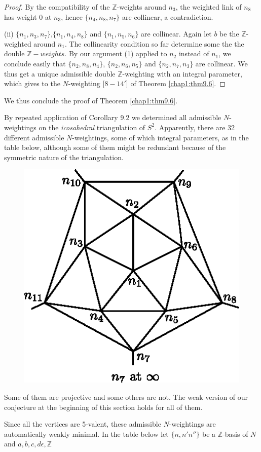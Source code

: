 \begin{proof}
By the compatibility of the $\mathbb{Z}$-weights around $n_3$, the
weighted link of $n_8$ has weight $0$ at $n_3$, hence $\{n_4, n_8,
n_7\}$ are collinear, a contradiction. 

(ii) $\{n_1, n_3, n_7\}$,\pageoriginale $\{n_1, n_4, n_8\}$ and  $\{n_1, n_5,
n_6\}$ are collinear. Again let $b$ be the $\mathbb{Z}$-weighted
around $n_1$. The collinearity condition so far determine some the the
double $\mathbb{Z}-weights$. By our argument (1) applied to $n_2$
instead of $n_1$, we conclude easily that $\{n_2, n_8, n_4\}$, 
$\{n_2,n_6, n_5\}$ and $\{n_2, n_7, n_3\}$ are collinear. We thus get a
unique admissible double $\mathbb{Z}$-weighting with an integral
parameter,  which gives to the $N$-weighting [$8-14'$] of Theorem
\ref{chap1:thm9.6}. 
\end{proof}

We thus conclude the proof of Theorem \ref{chap1:thm9.6}.

\begin{remark*}
By repeated application of Corollary 9.2 we determined all
admissible $N$-weightings on the \textit{icosahedral} triangulation of
$S^2$. Apparently, there are 32 different admissible $N$-weightings,
some of which integral parameters, as in the table below, although
some of them might be redundant because of the symmetric nature of the
triangulation. 
\begin{figure}[H]
\centering 
\includegraphics{vol58-fig/fig58-57.eps} 
\end{figure}

Some of them are projective and some others are not. The weak version
of our conjecture  at the beginning of this section holds for all of
them. 

Since all the vertices are 5-valent, these admissible $N$-weightings are
automatically weakly minimal. In the table below let $\{n,n'n''\}$ be
a $\mathbb{Z}$-basis of $N$ and $a,b,c,d\epsilon,\mathbb{Z}$ 
\end{remark*}

